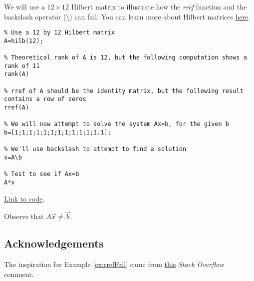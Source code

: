\documentclass{ximera}
\begin{document}
\begin{example}\label{ex:rrefFail}
    We will use a $12\times 12$ Hilbert matrix to illustrate how the \emph{rref} function and the backslash operator ($\setminus$) can fail.  You can learn more about Hilbert matrices \href{https://en.wikipedia.org/wiki/Hilbert_matrix}{here}.

\begin{verbatim}
% Use a 12 by 12 Hilbert matrix
A=hilb(12);

% Theoretical rank of A is 12, but the following computation shows a rank of 11
rank(A)

% rref of A should be the identity matrix, but the following result contains a row of zeros
rref(A)

% We will now attempt to solve the system Ax=b, for the given b
b=[1;1;1;1;1;1;1;1;1;1;1;1.1];

% We'll use backslash to attempt to find a solution
x=A\b

% Test to see if Ax=b
A*x

\end{verbatim}

\href{https://sagecell.sagemath.org/?z=eJxtkcFqwzAMhu8Gv4MuZe0og_RacshtD7Cxw7aDnSiNqGMXW26SPf2UpB07FIMxP9L__ZI38J4QDBQHsNN8v5KzGBl6w5FGraqyE2VbHHZHrbTawFuHISJTbRxE488QWqiAkjTvwWYG7hDa4FwYyJ-gDv0ls2EKHlIXhiSwe1tRaDW_t9Vu9Y4R29VPSrNrwOJiRw16Jp5uqR5xIqbsWHCeDfmFEobZ6wdjSMIR6z_OB8JAzoGXEsOM_UXsAqTgriswTUlUqMbS7gUSF_FEV_RgtbLlZ3F8eF6K7-Md8SSALMu1pj4nZ1I3I_7RWvKNxBRonrej1VhWX_a2ZExrIpTh2yWHfMXz-AvduIbw&lang=octave&interacts=eJyLjgUAARUAuQ==}{Link to code}.

Observe that $A\vec{x}\neq\vec{b}$. 
\end{example}

\subsection*{Acknowledgements}

The inspiration for Example \ref{ex:rrefFail} came from \href{https://stackoverflow.com/questions/42893111/matlab-rref-function-precision-error-after-12th-column-of-hilbert-matrices}{this} \emph{Stack Overflow} comment.

  
\end{document}
